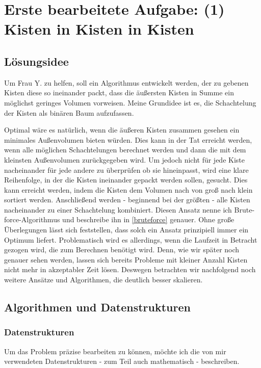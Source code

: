 \lstset{language=Scala}
\chapter[Erste bearbeitete Aufgabe: (1) Kisten in Kisten in Kisten]{Erste bearbeitete Aufgabe: \newline (1) Kisten in Kisten in Kisten}
\minitoc
\clearpage
\section{Lösungsidee}
 Um Frau Y. zu helfen, soll ein Algorithmus entwickelt werden, der zu gebenen Kisten diese so ineinander packt,
 dass die äußersten Kisten in Summe ein möglichst geringes Volumen vorweisen.
 Meine Grundidee ist es, die Schachtelung der Kisten als binären Baum aufzufassen.

 Optimal wäre es natürlich, wenn die äußeren Kisten zusammen gesehen ein minimales Außenvolumen bieten würden.
 Dies kann in der Tat erreicht werden, wenn alle möglichen Schachtelungen berechnet werden und dann die mit dem kleinsten Außenvolumen zurückgegeben wird.
 Um jedoch nicht für jede Kiste nacheinander für jede andere zu überprüfen ob sie hineinpasst, wird eine klare Reihenfolge, in der die Kisten ineinander gepackt werden sollen, gesucht.
 Dies kann erreicht werden, indem die Kisten dem Volumen nach von groß nach klein sortiert werden.
 Anschließend werden - beginnend bei der größten - alle Kisten nacheinander zu einer Schachtelung kombiniert.
 Diesen Ansatz nenne ich Brute-force-Algorithmus und beschreibe ihn in \ref{bruteforce} genauer.
 Ohne große Überlegungen lässt sich feststellen, dass solch ein Ansatz prinzipiell immer ein Optimum liefert.
 Problematisch wird es allerdings, wenn die Laufzeit in Betracht gezogen wird, die zum Berechnen benötigt wird.
 Denn, wie wir später noch genauer sehen werden, lassen sich bereits Probleme mit kleiner Anzahl Kisten nicht mehr in akzeptabler Zeit lösen.
 Deswegen betrachten wir nachfolgend noch weitere Ansätze und Algorithmen, die deutlich besser skalieren.
\section{Algorithmen und Datenstrukturen}
\subsection{Datenstrukturen}
 Um das Problem präzise bearbeiten zu können, möchte ich die von mir verwendeten Datenstrukturen - zum Teil auch mathematisch - beschreiben.

